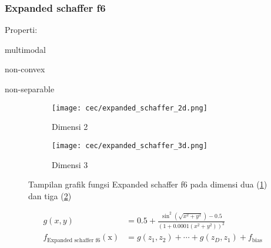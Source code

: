 \subsubsection*{Expanded schaffer f6}
\noindent Properti:
\begin{packed_item}
  \item multimodal
  \item non-convex
  \item non-separable
\end{packed_item}
\begin{figure}[H]
	\centering
	\begin{subfigure}[b]{0.4\textwidth}
		\centering
		\texttt{[image: cec/expanded\_schaffer\_2d.png]}
		\caption{Dimensi 2}
		\label{fig:schaffer-2d}
	\end{subfigure}
	\hfill
	\begin{subfigure}[b]{0.4\textwidth}
		\centering
		\texttt{[image: cec/expanded\_schaffer\_3d.png]}
		\caption{Dimensi 3}
		\label{fig:schaffer-3d}
	\end{subfigure}
	\caption{Tampilan grafik fungsi Expanded schaffer f6 pada dimensi dua (\cref{fig:schaffer-2d}) dan tiga (\cref{fig:schaffer-3d})}
	\label{fig:schaffer}
\end{figure}
\begin{equation}
  \begin{split}
    g\left(x,y \right) &= 0.5+\frac{\sin^2\left(\sqrt{x^2+y^2} \right)-0.5 }{\left( 1+0.0001\left(x^2+y^2 \right) \right)^2 }\\
    f_{\text{Expanded schaffer f6}}(\mathrm{x}) &= g\left(z_1,z_2 \right)+\cdots+g\left(z_D,z_1 \right)+f_{\text{bias}}
  \end{split}
\end{equation}

